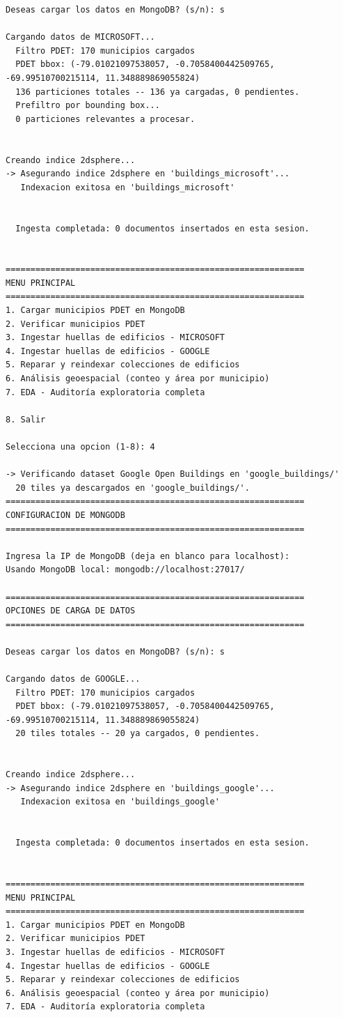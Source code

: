 \documentclass[12pt,a4paper]{article}
\begin{document}
\begin{lstlisting}[style=evidence]
Deseas cargar los datos en MongoDB? (s/n): s

Cargando datos de MICROSOFT...
  Filtro PDET: 170 municipios cargados
  PDET bbox: (-79.01021097538057, -0.7058400442509765, -69.99510700215114, 11.348889869055824)
  136 particiones totales -- 136 ya cargadas, 0 pendientes.
  Prefiltro por bounding box...
  0 particiones relevantes a procesar.


Creando indice 2dsphere...
-> Asegurando indice 2dsphere en 'buildings_microsoft'...
   Indexacion exitosa en 'buildings_microsoft'


  Ingesta completada: 0 documentos insertados en esta sesion.


============================================================
MENU PRINCIPAL
============================================================
1. Cargar municipios PDET en MongoDB
2. Verificar municipios PDET
3. Ingestar huellas de edificios - MICROSOFT
4. Ingestar huellas de edificios - GOOGLE
5. Reparar y reindexar colecciones de edificios
6. Análisis geoespacial (conteo y área por municipio)
7. EDA - Auditoría exploratoria completa

8. Salir

Selecciona una opcion (1-8): 4

-> Verificando dataset Google Open Buildings en 'google_buildings/'
  20 tiles ya descargados en 'google_buildings/'.
============================================================
CONFIGURACION DE MONGODB
============================================================

Ingresa la IP de MongoDB (deja en blanco para localhost): 
Usando MongoDB local: mongodb://localhost:27017/

============================================================
OPCIONES DE CARGA DE DATOS
============================================================

Deseas cargar los datos en MongoDB? (s/n): s

Cargando datos de GOOGLE...
  Filtro PDET: 170 municipios cargados
  PDET bbox: (-79.01021097538057, -0.7058400442509765, -69.99510700215114, 11.348889869055824)
  20 tiles totales -- 20 ya cargados, 0 pendientes.


Creando indice 2dsphere...
-> Asegurando indice 2dsphere en 'buildings_google'...
   Indexacion exitosa en 'buildings_google'


  Ingesta completada: 0 documentos insertados en esta sesion.


============================================================
MENU PRINCIPAL
============================================================
1. Cargar municipios PDET en MongoDB
2. Verificar municipios PDET
3. Ingestar huellas de edificios - MICROSOFT
4. Ingestar huellas de edificios - GOOGLE
5. Reparar y reindexar colecciones de edificios
6. Análisis geoespacial (conteo y área por municipio)
7. EDA - Auditoría exploratoria completa


\end{lstlisting}
\end{document}

